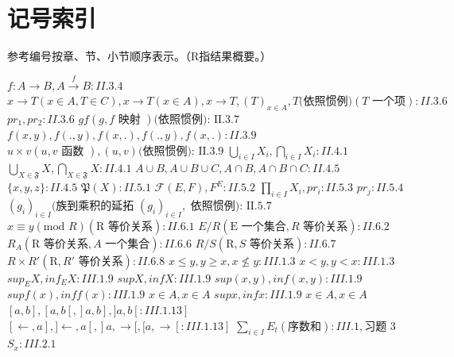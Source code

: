 \section*{记号索引}
{}

参考编号按章、节、小节顺序表示。（R指结果概要。）

\begin{Shaded}
\begin{Highlighting}[]
\end{Highlighting}
\end{Shaded}

\(f: A \to B, A \xrightarrow{f} B: II.3.4\) \(x \to T (x \in A, T \in C), x \to T (x \in A), x \to T, (T)_{x \in A}, T \text {(依照惯例)} (T \text { 一个项}): II.3.6\) \(pr_1, pr_2: II.3.6\) \(gf(g, f \text { 映射 }) \text {(依照惯例): II.3.7}\) \(f(x, y), f(., y), f(x, .), f(., y), f(x, .): II.3.9\) \(u \times v (u, v \text { 函数 }), (u, v) \text {(依照惯例): II.3.9}\) \(\bigcup_{i \in I} X_i, \bigcap_{i \in I} X_i: II.4.1\) \(\bigcup_{X \in \mathfrak{F}} X, \bigcap_{X \in \mathfrak{F}} X: II.4.1\) \(A \cup B, A \cup B \cup C, A \cap B, A \cap B \cap C: II.4.5\) \(\{x, y, z\}: II.4.5\) \(\mathfrak{P}(X): II.5.1\) \(\mathcal{F}(E, F), F^E: II.5.2\) \(\prod_{i \in I} X_i, pr_i: II.5.3\) \(pr_j: II.5.4\) \((g_i)_{i \in I} \text {(族到乘积的延拓 } (g_i)_{i \in I}, \text { 依照惯例): II.5.7}\) \(x \equiv y (\text {mod } R) (\text {R 等价关系}): II.6.1\) \(E/R (\text {E 一个集合}, R \text { 等价关系}): II.6.2\) \(R_A (\text {R 等价关系}, A \text { 一个集合}): II.6.6\) \(R/S (\text {R}, S \text { 等价关系}): II.6.7\) \(R \times R' (\text {R}, R' \text { 等价关系}): II.6.8\) \(x \leqslant y, y \geqslant x, x \not\leqslant y: III.1.3\) \(x < y, y < x: III.1.3\) \(sup_E X, inf_E X: III.1.9\) \(sup X, inf X: III.1.9\) \(sup (x, y), inf (x, y): III.1.9\) \(sup f(x), inf f(x): III.1.9\) \(x \in A, x \in A\) \(sup x, inf x: III.1.9\) \(x \in A, x \in A\) \([a, b], [a, b[, ]a, b], ]a, b[: III.1.13]\) \([\leftarrow, a], ]\leftarrow, a[, ]a, \rightarrow [, [a, \rightarrow[: III.1.13]\) \(\sum_{i \in I} E_t (\text {序数和}): III.1, \text{习题 3}\) \(S_x: III.2.1\)

